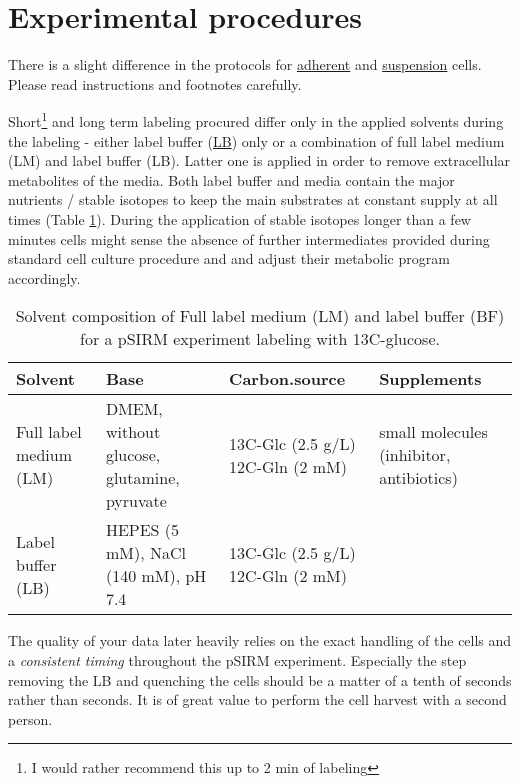\documentclass[]{book}
\let\rmarkdownfootnote\footnote%
\def\footnote{\protect\rmarkdownfootnote}
\begin{document}
\hypertarget{experimental-procedures}{%
\section{Experimental procedures}\label{experimental-procedures}}

There is a slight difference in the protocols for \protect\hyperlink{psirm:adherent}{adherent} and \protect\hyperlink{psirm:suspension}{suspension} cells. Please read instructions and footnotes carefully.

Short\footnote{I would rather recommend this up to 2 min of labeling} and long term labeling procured differ only in the applied solvents during the labeling - either label buffer (\protect\hyperlink{washingbuffer}{LB}) only or a combination of full label medium (LM) and label buffer (LB). Latter one is applied in order to remove extracellular metabolites of the media. Both label buffer and media contain the major nutrients / stable isotopes to keep the main substrates at constant supply at all times (Table \ref{tab:solvent}). During the application of stable isotopes longer than a few minutes cells might sense the absence of further intermediates provided during standard cell culture procedure and and adjust their metabolic program accordingly.

\begin{table}[t]

\caption{\label{tab:solvent}Solvent composition of Full label medium (LM) and label buffer (BF) for a pSIRM experiment labeling with 13C-glucose.}
\centering
\begin{tabular}{llll}
\toprule
Solvent & Base & Carbon.source & Supplements\\
\midrule
Full label medium (LM) & DMEM, without glucose, glutamine, pyruvate & 13C-Glc (2.5 g/L)
12C-Gln (2 mM) & small molecules 
(inhibitor, antibiotics)\\
Label buffer (LB) & HEPES (5 mM), NaCl (140 mM), pH 7.4 & 13C-Glc (2.5 g/L)
12C-Gln (2 mM) & \\
\bottomrule
\end{tabular}
\end{table}

The quality of your data later heavily relies on the exact handling of the cells and a \emph{consistent timing} throughout the pSIRM experiment. Especially the step removing the LB and quenching the cells should be a matter of a tenth of seconds rather than seconds. It is of great value to perform the cell harvest with a second person.
\end{document}

